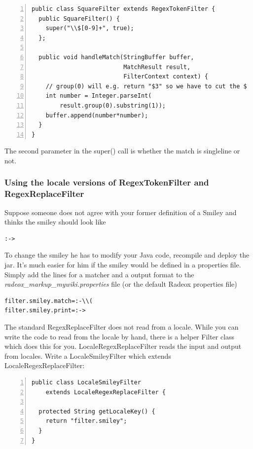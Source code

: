 \documentclass[a4paper,pdftex]{article}
\begin{document}
\begin{Verbatim}[gobble=0,frame=single,numbers=left,fontsize=\small]
public class SquareFilter extends RegexTokenFilter {
  public SquareFilter() {
    super("\\$[0-9]+", true);
  };

  public void handleMatch(StringBuffer buffer,
                          MatchResult result,
                          FilterContext context) {
    // group(0) will e.g. return "$3" so we have to cut the $
    int number = Integer.parseInt(
        result.group(0).substring(1));
    buffer.append(number*number);
  }
}
\end{Verbatim}

The second parameter in the super() call is whether the match is singleline or not.

\subsubsection{Using the locale versions of RegexTokenFilter and RegexReplaceFilter}

Suppose someone does not agree with your former definition of a Smiley and thinks the smiley should
look like 

\begin{verbatim}
:->
\end{verbatim}

To change the smiley he has to modify your Java code, recompile and deploy the jar. It's much easier
for him if the smiley would be defined in a properties file. Simply add the lines for a matcher and a output format
to the {\it radeox\_markup\_mywiki.properties} file (or the default Radeox properties file)

\begin{verbatim}
filter.smiley.match=:-\\(
filter.smiley.print=:->
\end{verbatim}

The standard RegexReplaceFilter does not read from a locale. While you can write the code
to read from the locale by hand, there is a helper Filter class which does this for you. LocaleRegexReplaceFilter
reads the input and output from locales. Write a LocaleSmileyFilter which extends LocaleRegexReplaceFilter:

\begin{Verbatim}[gobble=0,frame=single,numbers=left,fontsize=\small]
public class LocaleSmileyFilter
    extends LocaleRegexReplaceFilter {

  protected String getLocaleKey() {
    return "filter.smiley";
  }
}
\end{Verbatim}
\end{document}

